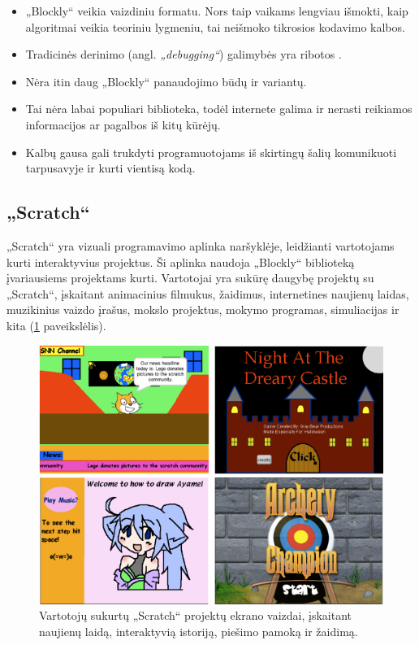 \documentclass{VUMIFPSkursinis}
\begin{document}
\begin{itemize}
    \item „Blockly“ veikia vaizdiniu formatu. Nors taip vaikams lengviau išmokti, kaip algoritmai veikia teoriniu lygmeniu, tai neišmoko tikrosios kodavimo kalbos.
    \item Tradicinės derinimo (angl. \textit{„debugging“}) galimybės yra ribotos \cite{victoria_2019}.
    \item Nėra itin daug „Blockly“ panaudojimo būdų ir variantų.
    \item Tai nėra labai populiari biblioteka, todėl internete galima ir nerasti reikiamos informacijos ar pagalbos iš kitų kūrėjų.
    \item Kalbų gausa gali trukdyti programuotojams iš skirtingų šalių komunikuoti tarpusavyje ir kurti vientisą kodą.
\end{itemize}

\subsection{„Scratch“}

„Scratch“ yra vizuali programavimo aplinka naršyklėje, leidžianti vartotojams kurti interaktyvius projektus. Ši aplinka naudoja „Blockly“ biblioteką įvariausiems projektams kurti. Vartotojai yra sukūrę daugybę projektų su „Scratch“, įskaitant animacinius filmukus, žaidimus, internetines naujienų laidas, muzikinius vaizdo įrašus, mokslo projektus, mokymo programas, simuliacijas ir kita (\ref{img:scratch} paveikslėlis).

\begin{figure}[H]
    \centering
    \includegraphics[scale=0.6]{img/scratch.png}
    \caption{Vartotojų sukurtų „Scratch“ projektų ekrano vaizdai, įskaitant naujienų laidą, interaktyvią istoriją, piešimo pamoką ir žaidimą.}
    \label{img:scratch}
\end{figure}
\end{document}
